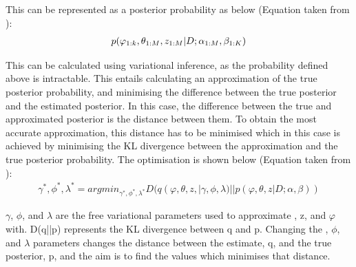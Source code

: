 This can be represented as a posterior probability as below (Equation taken from \cite{ldapost}):
\begin{align*}
	\boldmath{p(\varphi_{1:k}, \theta_{1:M}, z_{1:M} | D; \alpha_{1:M}, \beta_{1:K})}
\end{align*}

This can be calculated using variational inference, as the probability defined above is intractable. This entails calculating an approximation of the true posterior probability, and minimising the difference between the true posterior and the estimated posterior. In this case, the difference between the true and approximated posterior is the distance between them. To obtain the most accurate approximation, this distance has to be minimised which in this case is achieved by minimising the KL divergence \cite{kullback1951information} between the approximation and the true posterior probability. The optimisation is shown below (Equation taken from \cite{ldapost}):
\begin{align*}
	\gamma^{*}, \phi^{*}, \lambda^{*} = argmin_{\gamma^{*}, \phi^{*}, \lambda^{*}} D(q(\varphi, \theta, z, | \gamma, \phi, \lambda) ||p(\varphi, \theta, z | D; \alpha, \beta))
\end{align*}


$\gamma$, $\phi$, and $\lambda$ are the free variational parameters used to approximate \boldmath{$\theta$}, z, and $\varphi$ with. D(q||p) represents the KL divergence between q and p. Changing the \unboldmath{$\gamma$}, $\phi$, and $\lambda$ parameters changes the distance between the estimate, q, and the true posterior, p, and the aim is to find the values which minimises that distance.

